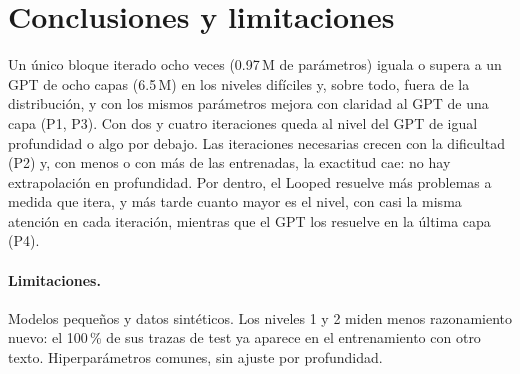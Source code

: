 \section{Conclusiones y limitaciones}

Un único bloque iterado ocho veces (0.97\,M de parámetros) iguala o supera a un
GPT de ocho capas (6.5\,M) en los niveles difíciles y, sobre todo, fuera de la
distribución, y con los mismos parámetros mejora con claridad al GPT de una capa
(P1, P3). Con dos y cuatro iteraciones queda al nivel del GPT de igual
profundidad o algo por debajo. Las iteraciones necesarias crecen con la
dificultad (P2) y, con menos o con más de las entrenadas, la exactitud cae: no
hay extrapolación en profundidad. Por dentro, el Looped resuelve más problemas a medida que itera, y más tarde cuanto mayor es el nivel, con casi la misma atención en cada iteración, mientras que el GPT los resuelve en la última capa (P4).

\paragraph{Limitaciones.}
Modelos pequeños y datos sintéticos. Los niveles 1 y 2 miden menos razonamiento nuevo: el 100\,\% de sus trazas de test ya aparece en
el entrenamiento con otro texto. Hiperparámetros comunes, sin ajuste por profundidad.

